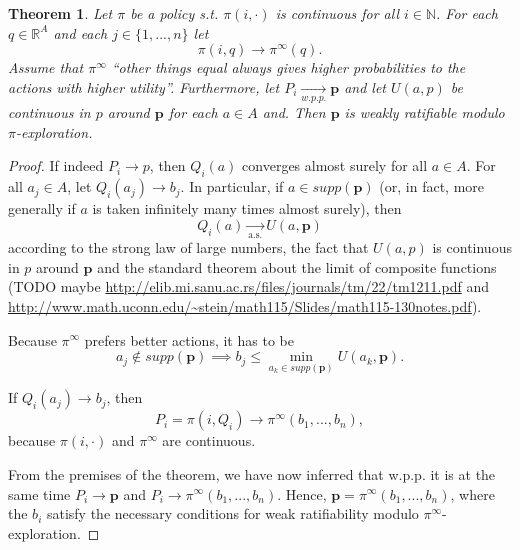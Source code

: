 \documentclass{article}
\newtheorem{thm}{Theorem} %
\begin{document}
\begin{thm}\label{theorem:weak-ratifiability-module-exploration}
Let $\pi$ be a policy s.t. $\pi(i,\cdot)$ is continuous for all $i\in \mathbb{N}$. For each $q\in \mathbb{R}^A$ and each $j\in \{1,...,n\}$ let
\begin{equation}
\pi (i, q) \rightarrow \pi^\infty (q).
\end{equation}
Assume that $\pi^\infty$ \enquote{other things equal always gives higher probabilities to the actions with higher utility}.
Furthermore, let $P_i \underset{w.p.p.}{\rightarrow} \mathbf{p}$ and let $U(a,p)$ be continuous in $p$ around $\mathbf{p}$ for each $a\in A$ and. Then $\mathbf{p}$ is weakly ratifiable modulo $\pi$-exploration.
\end{thm}

\begin{proof}
If indeed $P_i \rightarrow p$, then $Q_i(a)$ converges almost surely for all $a\in A$. For all $a_j\in A$, let $Q_i(a_j) \rightarrow b_j$. In particular, if $a\in supp(\mathbf{p})$ (or, in fact, more generally if $a$ is taken infinitely many times almost surely), then
\begin{equation}
Q_i(a)\underset{\text{a.s.}}{\rightarrow} U(a,\mathbf{p})
\end{equation}
according to the strong law of large numbers, the fact that $U(a,p)$ is continuous in $p$ around $\mathbf{p}$ and the standard theorem about the limit of composite functions (TODO maybe \url{http://elib.mi.sanu.ac.rs/files/journals/tm/22/tm1211.pdf} and \url{http://www.math.uconn.edu/~stein/math115/Slides/math115-130notes.pdf}).

Because $\pi^\infty$ prefers better actions, it has to be
\begin{equation}
a_j\notin supp(\mathbf{p}) \implies b_j \leq \min_{a_k\in supp (\mathbf{p}) } U(a_k,\mathbf{p}).
\end{equation}

If $Q_i(a_j)\rightarrow b_j$, then
\begin{equation}
P_i=\pi(i,Q_i)\rightarrow \pi^\infty (b_1,...,b_n),
\end{equation}
because $\pi(i,\cdot)$ and $\pi^\infty$ are continuous.

From the premises of the theorem, we have now inferred that w.p.p. it is at the same time $P_i\rightarrow \mathbf{p}$ and $P_i\rightarrow \pi^\infty (b_1,...,b_n)$. Hence, $\mathbf{p}=\pi^\infty(b_1,...,b_n)$, where the $b_i$ satisfy the necessary conditions for weak ratifiability modulo $\pi^\infty$-exploration.


\end{proof}
\end{document}
